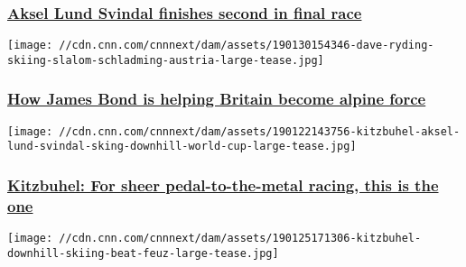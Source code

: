 \hypertarget{aksel-lund-svindal-finishes-second-in-final-race}{%
\subsubsection{\texorpdfstring{\href{/2019/02/09/sport/aksel-lund-svindal-world-ski-championships-downhill-spt-intl/index.html}{Aksel
Lund Svindal finishes second in final
race}}{Aksel Lund Svindal finishes second in final race}}\label{aksel-lund-svindal-finishes-second-in-final-race}}

\href{/2019/02/01/sport/britain-skiing-powerhouse-dan-hunt-spt-intl/index.html}{}

\texttt{[image: //cdn.cnn.com/cnnnext/dam/assets/190130154346-dave-ryding-skiing-slalom-schladming-austria-large-tease.jpg]}

\hypertarget{how-james-bond-is-helping-britain-become-alpine-force}{%
\subsubsection{\texorpdfstring{\href{/2019/02/01/sport/britain-skiing-powerhouse-dan-hunt-spt-intl/index.html}{How
James Bond is helping Britain become alpine
force}}{How James Bond is helping Britain become alpine force}}\label{how-james-bond-is-helping-britain-become-alpine-force}}

\href{/2019/01/25/sport/kitzbuhel-skiing-downhill-hahnenkamm-world-cup-spt-intl/index.html}{}

\texttt{[image: //cdn.cnn.com/cnnnext/dam/assets/190122143756-kitzbuhel-aksel-lund-svindal-sking-downhill-world-cup-large-tease.jpg]}

\hypertarget{kitzbuhel-for-sheer-pedal-to-the-metal-racing-this-is-the-one}{%
\subsubsection{\texorpdfstring{\href{/2019/01/25/sport/kitzbuhel-skiing-downhill-hahnenkamm-world-cup-spt-intl/index.html}{Kitzbuhel:
For sheer pedal-to-the-metal racing, this is the
one}}{Kitzbuhel: For sheer pedal-to-the-metal racing, this is the one}}\label{kitzbuhel-for-sheer-pedal-to-the-metal-racing-this-is-the-one}}

\href{/2019/01/25/sport/kitzbuhel-skiing-downhill-hahnenkamm-world-cup-party-spt-intl/index.html}{}

\texttt{[image: //cdn.cnn.com/cnnnext/dam/assets/190125171306-kitzbuhel-downhill-skiing-beat-feuz-large-tease.jpg]}


